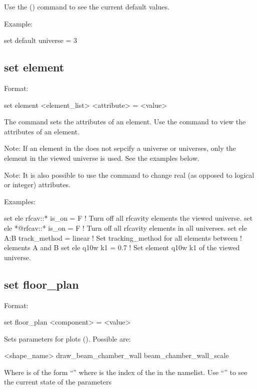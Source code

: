 {{Use the  () command to see the current
default values.

Example:
\begin{example}
  set default universe = 3
\end{example}


\subsection{set element}
\label{s:set.element}

Format:
\begin{example}
  set element <element_list> <attribute> = <value>
\end{example}

The  command sets the attributes of an element. Use the 
command to view the attributes of an element.

Note: If an element in the  does not sepcify a universe or universes,
only the element in the viewed universe is used. See the examples below.

Note: It is also possible to use the  command to change
real (as opposed to logical or integer) attributes.

Examples:
\begin{example}
  set ele rfcav::* is_on = F        ! Turn off all rfcavity elements the viewed universe.
  set ele *@rfcav::* is_on = F      ! Turn off all rfcavity elements in all universes.
  set ele A:B track_method = linear ! Set tracking_method for all elements between 
                                    !   elements A and B
  set ele q10w k1 = 0.7             ! Set element q10w k1 of the viewed universe.
\end{example}


\subsection{set floor_plan}
\label{s:set.floor.plan}

Format:
\begin{example}
  set floor_plan <component> = <value>
\end{example}


Sets parameters for  plots ().  Possible
 are:
\begin{example}
  <shape_name>%
  draw_beam_chamber_wall
  beam_chamber_wall_scale
\end{example}
Where  is of the form ``'' where  is the index
of the  in the  namelist.  Use ``'' to see the current state of the  parameters

}}
